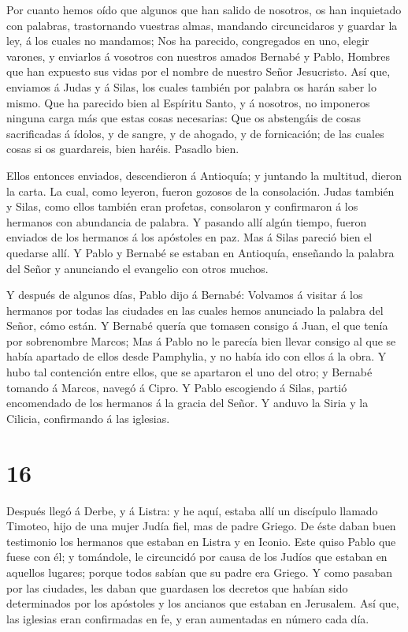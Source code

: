  Por cuanto hemos oído que algunos que han salido de
nosotros, os han inquietado con palabras, trastornando vuestras almas,
mandando circuncidaros y guardar la ley, á los cuales no mandamos;
 Nos ha parecido, congregados en uno, elegir varones, y
enviarlos á vosotros con nuestros amados Bernabé y Pablo, 
Hombres que han expuesto sus vidas por el nombre de nuestro Señor
Jesucristo.  Así que, enviamos á Judas y á Silas, los
cuales también por palabra os harán saber lo mismo.  Que ha
parecido bien al Espíritu Santo, y á nosotros, no imponeros ninguna
carga más que estas cosas necesarias:  Que os abstengáis de
cosas sacrificadas á ídolos, y de sangre, y de ahogado, y de
fornicación; de las cuales cosas si os guardareis, bien haréis. Pasadlo
bien.

 Ellos entonces enviados, descendieron á Antioquía; y
juntando la multitud, dieron la carta.  La cual, como
leyeron, fueron gozosos de la consolación.  Judas también y
Silas, como ellos también eran profetas, consolaron y confirmaron á los
hermanos con abundancia de palabra.  Y pasando allí algún
tiempo, fueron enviados de los hermanos á los apóstoles en paz.
 Mas á Silas pareció bien el quedarse allí.  Y
Pablo y Bernabé se estaban en Antioquía, enseñando la palabra del Señor
y anunciando el evangelio con otros muchos.

 Y después de algunos días, Pablo dijo á Bernabé: Volvamos
á visitar á los hermanos por todas las ciudades en las cuales hemos
anunciado la palabra del Señor, cómo están.  Y Bernabé
quería que tomasen consigo á Juan, el que tenía por sobrenombre Marcos;
 Mas á Pablo no le parecía bien llevar consigo al que se
había apartado de ellos desde Pamphylia, y no había ido con ellos á la
obra.  Y hubo tal contención entre ellos, que se apartaron
el uno del otro; y Bernabé tomando á Marcos, navegó á Cipro.
 Y Pablo escogiendo á Silas, partió encomendado de los
hermanos á la gracia del Señor.  Y anduvo la Siria y la
Cilicia, confirmando á las iglesias.

\hypertarget{section-15}{%
\section{16}\label{section-15}}

 Después llegó á Derbe, y á Listra: y he aquí, estaba allí
un discípulo llamado Timoteo, hijo de una mujer Judía fiel, mas de padre
Griego.  De éste daban buen testimonio los hermanos que
estaban en Listra y en Iconio.  Este quiso Pablo que fuese
con él; y tomándole, le circuncidó por causa de los Judíos que estaban
en aquellos lugares; porque todos sabían que su padre era Griego.
 Y como pasaban por las ciudades, les daban que guardasen
los decretos que habían sido determinados por los apóstoles y los
ancianos que estaban en Jerusalem.  Así que, las iglesias
eran confirmadas en fe, y eran aumentadas en número cada día.

